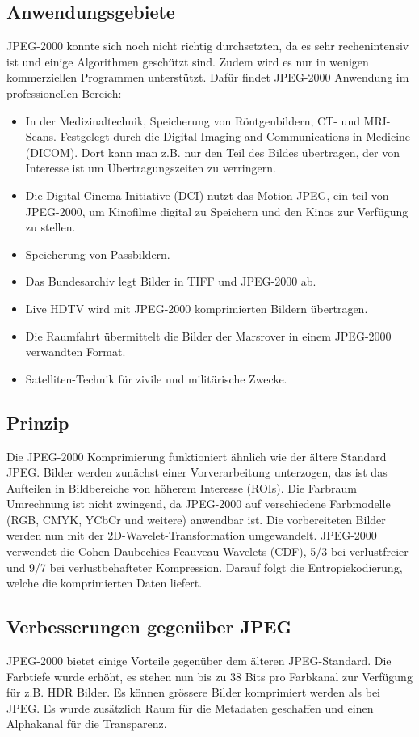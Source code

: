 \subsection{Anwendungsgebiete
\label{jpeg:subsection:anwendungsgebiete}}
JPEG-2000 konnte sich noch nicht richtig durchsetzten, da es sehr rechenintensiv ist und einige Algorithmen geschützt sind.
Zudem wird es nur in wenigen kommerziellen Programmen unterstützt.
Dafür findet JPEG-2000 Anwendung im professionellen Bereich:
\begin{itemize}
    \item In der Medizinaltechnik, Speicherung von Röntgenbildern, CT- und MRI-Scans.
    Festgelegt durch die Digital Imaging and Communications in Medicine (DICOM).
    Dort kann man z.B. nur den Teil des Bildes übertragen, der von Interesse ist um Übertragungszeiten zu verringern.
    \item Die Digital Cinema Initiative (DCI) nutzt das Motion-JPEG, ein teil von JPEG-2000, um Kinofilme digital zu Speichern und den Kinos zur Verfügung zu stellen.
    \item Speicherung von Passbildern.
    \item Das Bundesarchiv legt Bilder in TIFF und JPEG-2000 ab.
    \item Live HDTV wird mit JPEG-2000 komprimierten Bildern übertragen.
    \item Die Raumfahrt übermittelt die Bilder der Marsrover in einem JPEG-2000 verwandten Format.
    \item Satelliten-Technik für zivile und militärische Zwecke.   
\end{itemize}


\subsection{Prinzip
\label{jpeg:subsection:prinzip}}
Die JPEG-2000 Komprimierung funktioniert ähnlich wie der ältere Standard JPEG.
Bilder werden zunächst einer Vorverarbeitung unterzogen, das ist das Aufteilen in Bildbereiche von höherem Interesse (ROIs).
Die Farbraum Umrechnung ist nicht zwingend, da JPEG-2000 auf verschiedene Farbmodelle (RGB, CMYK, YCbCr und weitere) anwendbar ist.
Die vorbereiteten Bilder werden nun mit der 2D-Wavelet-Transformation umgewandelt.
JPEG-2000 verwendet die Cohen-Daubechies-Feauveau-Wavelets (CDF), 5/3 bei verlustfreier und 9/7 bei verlustbehafteter Kompression.
Darauf folgt die Entropiekodierung, welche die komprimierten Daten liefert. 

\subsection{Verbesserungen gegenüber JPEG
\label{jpeg:subsection:verbesserungen}}
JPEG-2000 bietet einige Vorteile gegenüber dem älteren JPEG-Standard.
Die Farbtiefe wurde erhöht, es stehen nun bis zu 38 Bits pro Farbkanal zur Verfügung für z.B. HDR Bilder.
Es können grössere Bilder komprimiert werden als bei JPEG.
Es wurde zusätzlich Raum für die Metadaten geschaffen und einen Alphakanal für die Transparenz.
 
